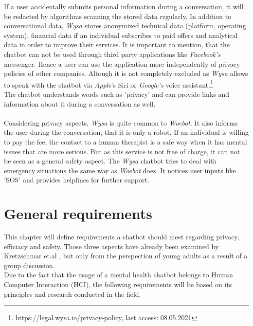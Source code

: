 \documentclass[sigconf, nonacm]{acmart}
\begin{document}
If a user accidentally submits personal information during a conversation, it will be redacted by algorithms scanning the stored data regularly. In addition to conversational data, \emph{Wysa} stores anonymized technical data (platform, operating system), 
financial data if an individual subscribes to paid offers and analytical data in order to improve their services. 
It is important to mention, that the chatbot can not be used through third party applications like \emph{Facebook's} messenger. Hence a user can use the application more independently of privacy policies of other companies. Altough it is not completely excluded as \emph{Wysa} allows to speak with the chatbot 
via \emph{Apple}'s Siri or \emph{Google's} voice assistant.\footnote{https://legal.wysa.io/privacy-policy, last access: 08.05.2021}
\\
The chatbot understands words such as 'privacy' and can provide links and information about it during a conversation as well.\cite{Kretzschmar2019}
\\\\
Considering privacy aspects, \emph{Wysa} is quite common to \emph{Woebot}. It also informs the user during the conversation, that it is only a robot. If an individual is willing to pay the fee, the contact to a human therapist is a safe way when it has mental issues that are 
more serious. But as this service is not free of charge, it can not be seen as a general safety aspect. The \emph{Wysa} chatbot tries to deal with emergency situations the same way as \emph{Woebot} does. It notices user inputs like 'SOS' and provides helplines for further support.\cite{Kretzschmar2019}
\section{General requirements}
This chapter will define requirements a chatbot should meet regarding privacy, efficiacy and safety. Those three aspects have already been examined by Kretzschmar et.al \cite{Kretzschmar2019}, but only from the perspection of young adults as a result of a group discussion.
\\
Due to the fact that the usage of a mental health chatbot belongs to Human Computer Interaction (HCI), the following requirements will be based on its principles and research conducted in the field.
\end{document}
